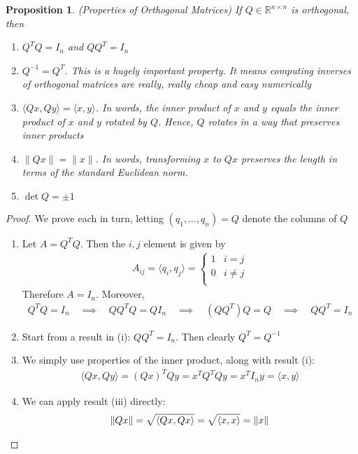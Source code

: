 \documentclass[12pt]{article}
\numberwithin{equation}{section} %
\theoremstyle{plain}
\newtheorem{prop}[thm]{Proposition}
\theoremstyle{definition}
\theoremstyle{remark}
\newcommand{\Rnn}{\mathbb{R}^{n\times n}}
\begin{document}
\begin{prop}\emph{(Properties of Orthogonal Matrices)}
If $Q\in\Rnn$ is orthogonal, then
\begin{enumerate}[label=\emph{(\roman*)}]
  \item $Q^TQ=I_n$ and $QQ^T=I_n$
  \item $Q^{-1}=Q^T$. This is a hugely important property. It means
    computing inverses of orthogonal matrices are really, really cheap
    and easy numerically
  \item $\langle Qx, Qy \rangle=\langle x, y \rangle$. In words,
    the inner product of $x$ and $y$ equals the inner product of $x$ and
    $y$ rotated by $Q$. Hence, $Q$ rotates in a way that preserves inner
    products
  \item $\lVert Qx \rVert =\lVert x\rVert$.
    In words, transforming $x$ to $Qx$ preserves the length in terms of
    the standard Euclidean norm.
  \item $\det Q = \pm 1$
\end{enumerate}
\end{prop}
\begin{proof}
We prove each in turn, letting $(q_1,\ldots,q_n)=Q$ denote the columns
of $Q$
\begin{enumerate}[label=(\roman*)]
  \item Let $A=Q^TQ$. Then the $i,j$ element is given by
    \begin{align*}
      A_{ij} = \langle q_i, q_j\rangle
      = \begin{cases}
          1 & i=j \\
          0 & i\neq j \\
        \end{cases}
    \end{align*}
    Therefore $A=I_n$. Moreover,
    \begin{align*}
      Q^TQ = I_n
      \quad\implies\quad
      QQ^TQ = Q I_n
      \quad\implies\quad
      (QQ^T)Q = Q
      \quad\implies\quad
      QQ^T=I_n
    \end{align*}

  \item
    Start from a result in (i): $QQ^T = I_n$. Then clearly
    $Q^T = Q^{-1}$
  \item
    We simply use properties of the inner product, along with result
    (i):
    \begin{align*}
      \langle Qx, Qy \rangle
      =
      (Qx)^T Qy
      = x^T Q^TQ y = x^T I_n y = \langle x, y\rangle
    \end{align*}
  \item
    We can apply result (iii) directly:
    \begin{align*}
      \lVert Qx\rVert
      =
      \sqrt{%
      \langle Qx,Qx\rangle
      }
      =
      \sqrt{%
      \langle x,x\rangle
      }
      = \lVert x\rVert
    \end{align*}
\end{enumerate}
\end{proof}
\end{document}
